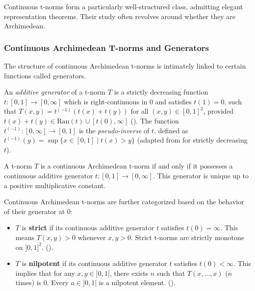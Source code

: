 Continuous t-norms form a particularly well-structured class, admitting elegant representation theorems. Their study often revolves around whether they are Archimedean.

\subsubsection{Continuous Archimedean T-norms and Generators}
The structure of continuous Archimedean t-norms is intimately linked to certain functions called generators.
\begin{definition}
  An \emph{additive generator} of a t-norm $T$ is a strictly decreasing function $t: [0,1] \to [0,\infty]$ which is right-continuous in $0$ and satisfies $t(1)=0$, such that $T(x,y) = t^{(-1)}(t(x) + t(y))$ for all $(x,y) \in [0,1]^2$, provided $t(x)+t(y) \in \mathrm{Ran}(t) \cup [t(0),\infty]$ (\cite[Def.~3.25, p.~70]{Klement2000}).
  The function $t^{(-1)}: [0,\infty] \to [0,1]$ is the \emph{pseudo-inverse} of $t$, defined as $t^{(-1)}(y) = \sup \{ x \in [0,1] \mid t(x) > y \}$ (adapted from \cite[Def.~3.2, p.~68 and Cor.~3.3]{Klement2000} for strictly decreasing $t$). 
\end{definition}

\begin{theorem}
  A t-norm $T$ is a continuous Archimedean t-norm if and only if it possesses a continuous additive generator $t: [0,1] \to [0,\infty]$. This generator is unique up to a positive multiplicative constant.
\end{theorem}
Continuous Archimedean t-norms are further categorized based on the behavior of their generator at $0$:
\begin{itemize}
    \item $T$ is \textbf{strict} if its continuous additive generator $t$ satisfies $t(0)=\infty$. This means $T(x,y)>0$ whenever $x,y > 0$. Strict t-norms are strictly monotone on $]0,1]^2$. (\cite[Cor.~3.30(i), p.~88; Def.~2.13(i), p.~42]{Klement2000}).
    \item $T$ is \textbf{nilpotent} if its continuous additive generator $t$ satisfies $t(0)<\infty$. This implies that for any $x,y \in ]0,1[$, there exists $n$ such that $T(x, \dots, x)$ ($n$ times) is $0$. Every $a \in ]0,1[$ is a nilpotent element. (\cite[Cor.~3.30(ii), p.~88; Def.~2.13(ii), p.~42]{Klement2000}).
\end{itemize}

